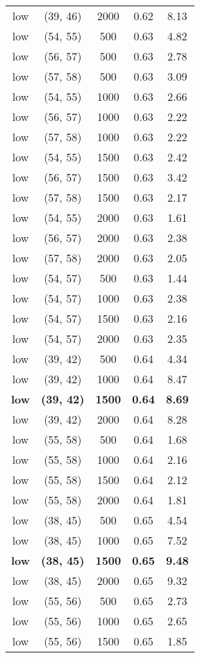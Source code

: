\begin{tabular}{c c c c c}
low & (39, 46) &  2000 & 0.62 & 8.13 \\
low & (54, 55) &  500 & 0.63 & 4.82 \\
low & (56, 57) &  500 & 0.63 & 2.78 \\
low & (57, 58) &  500 & 0.63 & 3.09 \\
low & (54, 55) &  1000 & 0.63 & 2.66 \\
low & (56, 57) &  1000 & 0.63 & 2.22 \\
low & (57, 58) &  1000 & 0.63 & 2.22 \\
low & (54, 55) &  1500 & 0.63 & 2.42 \\
low & (56, 57) &  1500 & 0.63 & 3.42 \\
low & (57, 58) &  1500 & 0.63 & 2.17 \\
low & (54, 55) &  2000 & 0.63 & 1.61 \\
low & (56, 57) &  2000 & 0.63 & 2.38 \\
low & (57, 58) &  2000 & 0.63 & 2.05 \\
low & (54, 57) &  500 & 0.63 & 1.44 \\
low & (54, 57) &  1000 & 0.63 & 2.38 \\
low & (54, 57) &  1500 & 0.63 & 2.16 \\
low & (54, 57) &  2000 & 0.63 & 2.35 \\
low & (39, 42) &  500 & 0.64 & 4.34 \\
low & (39, 42) &  1000 & 0.64 & 8.47 \\
\textbf{low} & \textbf{(39, 42)} & \textbf{ 1500} & \textbf{0.64} & \textbf{8.69} \\
low & (39, 42) &  2000 & 0.64 & 8.28 \\
low & (55, 58) &  500 & 0.64 & 1.68 \\
low & (55, 58) &  1000 & 0.64 & 2.16 \\
low & (55, 58) &  1500 & 0.64 & 2.12 \\
low & (55, 58) &  2000 & 0.64 & 1.81 \\
low & (38, 45) &  500 & 0.65 & 4.54 \\
low & (38, 45) &  1000 & 0.65 & 7.52 \\
\textbf{low} & \textbf{(38, 45)} & \textbf{ 1500} & \textbf{0.65} & \textbf{9.48} \\
low & (38, 45) &  2000 & 0.65 & 9.32 \\
low & (55, 56) &  500 & 0.65 & 2.73 \\
low & (55, 56) &  1000 & 0.65 & 2.65 \\
low & (55, 56) &  1500 & 0.65 & 1.85 \\

\end{tabular}
